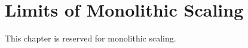 \chapter{Limits of Monolithic Scaling}
\label{chap:monolithic-scaling}

This chapter is reserved for monolithic scaling.

